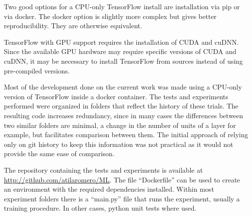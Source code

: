 Two good options for a CPU-only TensorFlow install are installation via pip or via docker. The docker option is slightly more complex but gives better reproducibility. They are otherwise equivalent.

TensorFlow with GPU support requires the installation of CUDA and cuDNN. Since the available GPU hardware may require specific versions of CUDA and cuDNN, it may be necessary to install TensorFlow from sources instead of using pre-compiled versions.

Most of the development done on the current work was made using a CPU-only version of TensorFlow inside a docker container. The tests and experiments performed were organized in folders that reflect the history of these trials. The resulting code increases redundancy, since in many cases the differences between two similar folders are minimal, a change in the number of units of a layer for example, but facilitates comparison between them. The initial approach of relying only on git history to keep this information was not practical as it would not provide the same ease of comparison.

The repository containing the tests and experiments is available at \url{http://github.com/atilaromero/ML}. The file ``Dockerfile'' can be used to create an environment with the required dependencies installed. Within most experiment folders there is a ``main.py'' file that runs the experiment, usually a training procedure. In other cases, python unit tests where used.

